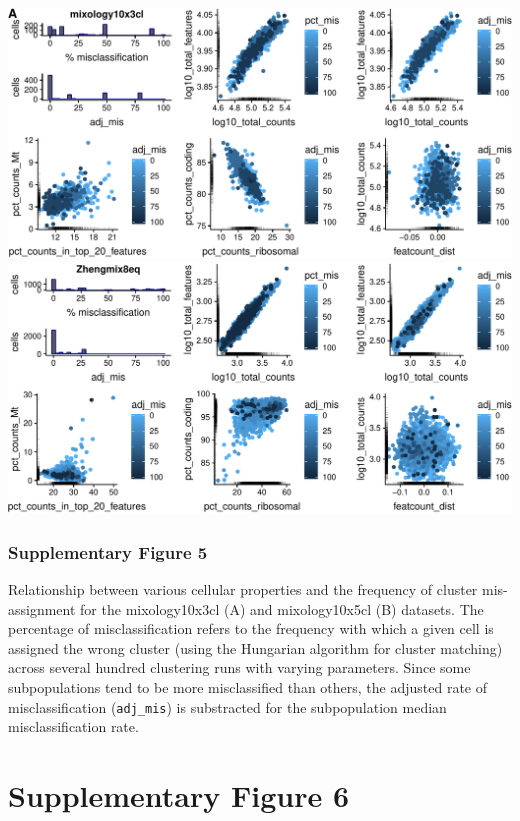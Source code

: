 \documentclass[]{article}
\begin{document}
\includegraphics{supp_figures_files/figure-latex/misclass-1.pdf} \vfill
\includegraphics{supp_figures_files/figure-latex/unnamed-chunk-7-1.pdf}

\hypertarget{supplementary-figure-5-1}{%
\subsubsection{Supplementary Figure 5}\label{supplementary-figure-5-1}}

Relationship between various cellular properties and the frequency of
cluster mis-assignment for the mixology10x3cl (A) and mixology10x5cl (B)
datasets. The percentage of misclassification refers to the frequency
with which a given cell is assigned the wrong cluster (using the
Hungarian algorithm for cluster matching) across several hundred
clustering runs with varying parameters. Since some subpopulations tend
to be more misclassified than others, the adjusted rate of
misclassification (\texttt{adj\_mis}) is substracted for the
subpopulation median misclassification rate.

\newpage

\hypertarget{supplementary-figure-6}{%
\section{Supplementary Figure 6}\label{supplementary-figure-6}}
\end{document}
